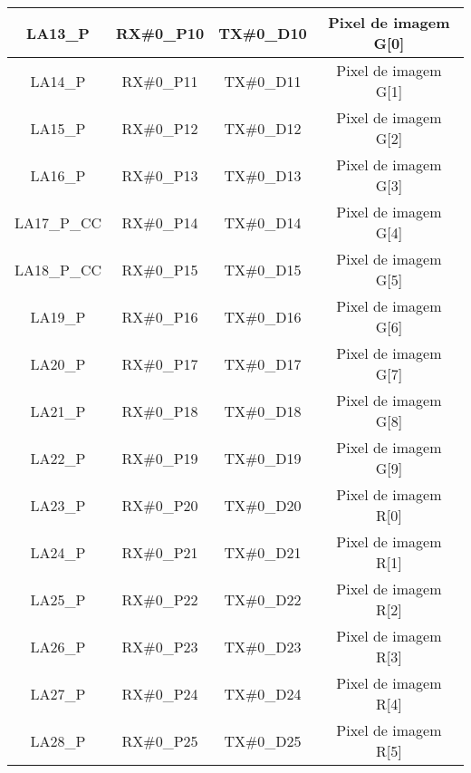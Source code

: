 \begin{table}[h!]
\begin{tabular}{|c|c|c|c|}
		LA13\_P      & RX\#0\_P10                           & TX\#0\_D10                         & Pixel de imagem G{[}0{]} \\ \hline
		LA14\_P      & RX\#0\_P11                           & TX\#0\_D11                         & Pixel de imagem G{[}1{]} \\ \hline
		LA15\_P      & RX\#0\_P12                           & TX\#0\_D12                         & Pixel de imagem G{[}2{]} \\ \hline
		LA16\_P      & RX\#0\_P13                           & TX\#0\_D13                         & Pixel de imagem G{[}3{]} \\ \hline
		LA17\_P\_CC  & RX\#0\_P14                           & TX\#0\_D14                         & Pixel de imagem G{[}4{]} \\ \hline
		LA18\_P\_CC  & RX\#0\_P15                           & TX\#0\_D15                         & Pixel de imagem G{[}5{]} \\ \hline
		LA19\_P      & RX\#0\_P16                           & TX\#0\_D16                         & Pixel de imagem G{[}6{]} \\ \hline
		LA20\_P      & RX\#0\_P17                           & TX\#0\_D17                         & Pixel de imagem G{[}7{]} \\ \hline
		LA21\_P      & RX\#0\_P18                           & TX\#0\_D18                         & Pixel de imagem G{[}8{]} \\ \hline
		LA22\_P      & RX\#0\_P19                           & TX\#0\_D19                         & Pixel de imagem G{[}9{]} \\ \hline
		LA23\_P      & RX\#0\_P20                           & TX\#0\_D20                         & Pixel de imagem R{[}0{]} \\ \hline
		LA24\_P      & RX\#0\_P21                           & TX\#0\_D21                         & Pixel de imagem R{[}1{]} \\ \hline
		LA25\_P      & RX\#0\_P22                           & TX\#0\_D22                         & Pixel de imagem R{[}2{]} \\ \hline
		LA26\_P      & RX\#0\_P23                           & TX\#0\_D23                         & Pixel de imagem R{[}3{]} \\ \hline
		LA27\_P      & RX\#0\_P24                           & TX\#0\_D24                         & Pixel de imagem R{[}4{]} \\ \hline
		LA28\_P      & RX\#0\_P25                           & TX\#0\_D25                         & Pixel de imagem R{[}5{]} \\ \hline

\end{tabular}
\end{table}
